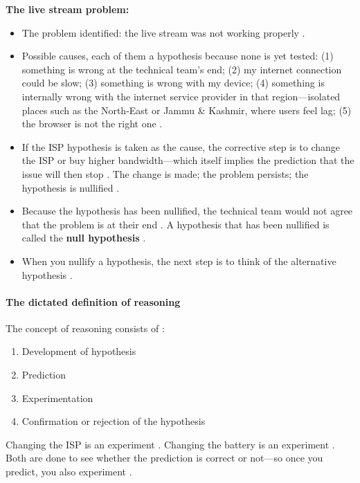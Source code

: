 \begin{ExampleBox}
\textbf{The live stream problem:}
\begin{itemize}
    \item The problem identified: the live stream was not working properly .
    \item Possible causes, each of them a hypothesis because none is yet tested: (1) something is wrong at the technical team's end; (2) my internet connection could be slow; (3) something is wrong with my device; (4) something is internally wrong with the internet service provider in that region---isolated places such as the North-East or Jammu \& Kashmir, where users feel lag; (5) the browser is not the right one .
    \item If the ISP hypothesis is taken as the cause, the corrective step is to change the ISP or buy higher bandwidth---which itself implies the prediction that the issue will then stop . The change is made; the problem persists; the hypothesis is nullified .
    \item Because the hypothesis has been nullified, the technical team would not agree that the problem is at their end . A hypothesis that has been nullified is called the \textbf{null hypothesis} .
    \item When you nullify a hypothesis, the next step is to think of the alternative hypothesis .
\end{itemize}
\end{ExampleBox}

\paragraph{The dictated definition of reasoning}
The concept of reasoning consists of :
\begin{enumerate}
    \item Development of hypothesis 
    \item Prediction 
    \item Experimentation 
    \item Confirmation or rejection of the hypothesis 
\end{enumerate}
Changing the ISP is an experiment . Changing the battery is an experiment . Both are done to see whether the prediction is correct or not---so once you predict, you also experiment .

